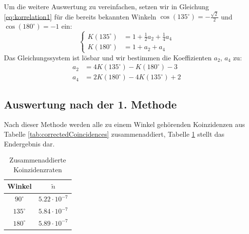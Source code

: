 \documentclass[a4paper,titlepage]{scrartcl}
\numberwithin{equation}{section}
\begin{document}
Um die weitere Auswertung zu vereinfachen, setzen wir in Gleichung \ref{eq:korrelation1} für die bereits bekannten Winkeln $\cos(135^{\circ})=-\frac{\sqrt{2}}{2}$ und $\cos(180^{\circ})=-1$ ein:
\begin{equation*}
\left\{
\begin{aligned}
K(135^{\circ})&=1+\frac{1}{2}a_2+\frac{1}{4}a_4\\
K(180^{\circ})&=1+a_2+a_4
\end{aligned}
\right.
\end{equation*}
Das Gleichungssystem ist lösbar und wir bestimmen die Koeffizienten $a_2$, $a_4$ zu:
\begin{equation}
\label{eq:koeffizientenEinfach}
\begin{aligned}
a_2&=4K(135^{\circ})-K(180^{\circ})-3\\
a_4&=2K(180^{\circ}) - 4K(135^{\circ}) + 2
\end{aligned}
\end{equation}
\subsection{Auswertung nach der 1. Methode}
Nach dieser Methode werden alle zu einem Winkel gehörenden Koinzidenzen aus Tabelle \ref{tab:correctedCoincidences} zusammenaddiert, Tabelle \ref{tab:addedCoincidence} stellt das Endergebnis dar.
\begin{table}[H]
\centering
\begin{tabular}{c|c}
Winkel & $\tilde{n}$\\
\hline
$90^{\circ}$ & $5.22 \cdot 10^{-7}$\\
$135^{\circ}$ & $5.84 \cdot 10^{-7}$\\
$180^{\circ}$ & $5.89 \cdot 10^{-7}$\\
\end{tabular}
\caption{Zusammenaddierte Koinzidenzraten}
\label{tab:addedCoincidence}
\end{table}
\end{document}
